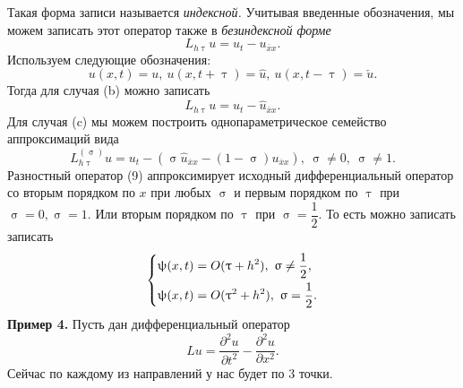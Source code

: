 \documentclass[a4paper, 12pt]{report}
\numberwithin{equation}{section}
\newcommand{\ol}{\overline}
\renewcommand{\tau}{\uptau}
\renewcommand{\sigma}{\upsigma}
\renewcommand{\psi}{\uppsi}
\renewcommand{\d}{\partial}
\begin{document}
Такая форма записи называется \textit{индексной.}
Учитывая введенные обозначения, мы можем записать этот оператор также в \textit{безиндексной форме}
\begin{equation}
L_{h\tau} u = u_t - u_{\ol x x}.
\end{equation}
Используем следующие обозначения: $$u(x,t) = u,\ u(x, t+\tau) = \hat u, \ u(x, t-\tau) = \check {u}.$$
Тогда для случая (b) можно записать \begin{equation}
L_{h\tau} u = u_t - \hat u_{\ol x x}.
\end{equation}
Для случая (c) мы можем построить однопараметрическое семейство аппроксимаций вида
\begin{equation}
L_{h\tau}^{(\sigma)}u = u_{t} - (\sigma \hat u_{\ol x x} - (1-\sigma) u_{\ol x x}),\ \sigma \ne 0,\ \sigma \ne 1.
\end{equation}
Разностный оператор (9) аппроксимирует исходный дифференциальный оператор со вторым порядком по $x$ при любых $\sigma$ и первым порядком по $\tau$ при $\sigma =0, \sigma = 1$. Или вторым порядком по $\tau$ при $\sigma = \dfrac 12$. То есть можно записать записать 
\begin{equation}
\begin{dcases}
	\psi(x,t) = O(\tau + h^2),\ \sigma \ne \dfrac 12,\\
	\psi(x,t) = O(\tau^2 + h^2),\ \sigma = \dfrac 12.
\end{dcases}
\end{equation}
\textbf{Пример 4.} Пусть дан дифференциальный оператор $$Lu = \dfrac{\d ^2u}{\d t^2} - \dfrac{\d ^2 u}{\d x^2}.$$
Сейчас по каждому из направлений у нас будет по 3 точки.
\end{document}
